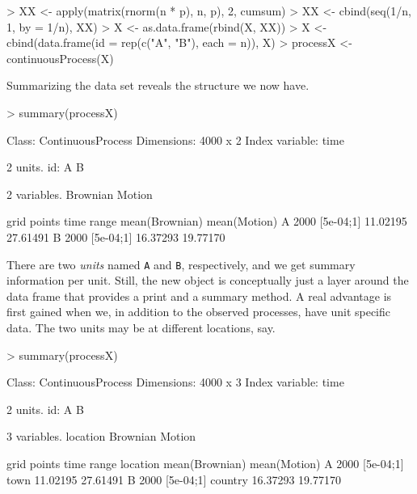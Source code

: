 \documentclass[11pt,a4paper,twoside]{article}
\begin{document}
\begin{Schunk}
\begin{Sinput}
> XX <- apply(matrix(rnorm(n * p), n, p), 2, cumsum)
> XX <- cbind(seq(1/n, 1, by = 1/n), XX)
> X <- as.data.frame(rbind(X, XX))
> X <- cbind(data.frame(id = rep(c("A", "B"), each = n)), X)
> processX <- continuousProcess(X)
\end{Sinput}
\end{Schunk}

Summarizing the data set reveals the structure we now have. 

\begin{Schunk}
\begin{Sinput}
> summary(processX)
\end{Sinput}
\begin{Soutput}
Class: ContinuousProcess 
Dimensions: 4000 x 2 
Index variable: time 

2 units.
   id: A B

2 variables.
   Brownian Motion

  grid points time range mean(Brownian) mean(Motion)
A        2000  [5e-04;1]       11.02195     27.61491
B        2000  [5e-04;1]       16.37293     19.77170
\end{Soutput}
\end{Schunk}

There are two \emph{units} named \verb+A+ and \verb+B+, respectively,
and we get summary information per unit. Still, the new object is
conceptually just a layer around the data frame that provides a
print and a summary method. A real advantage is first gained when we, in
addition to the observed processes, have unit specific data. The two
units may be at different locations, say. 


\begin{Schunk}
\begin{Sinput}
> summary(processX)
\end{Sinput}
\begin{Soutput}
Class: ContinuousProcess 
Dimensions: 4000 x 3 
Index variable: time 

2 units.
   id: A B

3 variables.
   location Brownian Motion

  grid points time range location mean(Brownian) mean(Motion)
A        2000  [5e-04;1]     town       11.02195     27.61491
B        2000  [5e-04;1]  country       16.37293     19.77170
\end{Soutput}
\end{Schunk}
\end{document}
